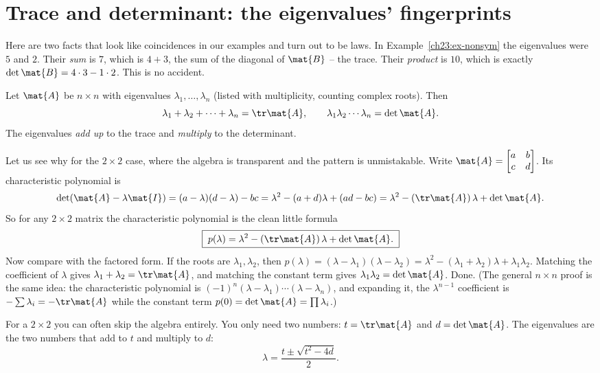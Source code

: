 \section{Trace and determinant: the eigenvalues' fingerprints}
\label{ch23:trace-det}

Here are two facts that look like coincidences in our examples and turn out to be
laws. In Example~\ref{ch23:ex-nonsym} the eigenvalues were $5$ and $2$. Their
\emph{sum} is $7$, which is $4+3$, the sum of the diagonal of $\mat{B}$ -- the
trace. Their \emph{product} is $10$, which is exactly $\det\mat{B}=4\cdot 3-1\cdot 2$.
This is no accident.

\begin{theorem}
\label{ch23:thm-trace-det}
Let $\mat{A}$ be $n\times n$ with eigenvalues $\lambda_1,\dots,\lambda_n$ (listed
with multiplicity, counting complex roots). Then
\[
  \lambda_1+\lambda_2+\cdots+\lambda_n=\tr\mat{A},
  \qquad
  \lambda_1\lambda_2\cdots\lambda_n=\det\mat{A}.
\]
The eigenvalues \emph{add up} to the trace and \emph{multiply} to the determinant.
\end{theorem}

Let us see why for the $2\times 2$ case, where the algebra is transparent and the
pattern is unmistakable. Write
$\mat{A}=\begin{bmatrix}a&b\\c&d\end{bmatrix}$. Its characteristic polynomial is
\[
  \det(\mat{A}-\lambda\mat{I})
  =(a-\lambda)(d-\lambda)-bc
  =\lambda^2-(a+d)\lambda+(ad-bc)
  =\lambda^2-(\tr\mat{A})\,\lambda+\det\mat{A}.
\]
So for any $2\times 2$ matrix the characteristic polynomial is the clean little
formula
\[
  \boxed{\;p(\lambda)=\lambda^2-(\tr\mat{A})\,\lambda+\det\mat{A}.\;}
\]
Now compare with the factored form. If the roots are $\lambda_1,\lambda_2$, then
$p(\lambda)=(\lambda-\lambda_1)(\lambda-\lambda_2)=\lambda^2-(\lambda_1+\lambda_2)\lambda+\lambda_1\lambda_2$.
Matching the coefficient of $\lambda$ gives
$\lambda_1+\lambda_2=\tr\mat{A}$, and matching the constant term gives
$\lambda_1\lambda_2=\det\mat{A}$. Done. (The general $n\times n$ proof is the same
idea: the characteristic polynomial is
$(-1)^n(\lambda-\lambda_1)\cdots(\lambda-\lambda_n)$, and expanding it, the
$\lambda^{n-1}$ coefficient is $-\sum\lambda_i=-\tr\mat{A}$ while the constant term
$p(0)=\det\mat{A}=\prod\lambda_i$.)

\begin{focusbox}
For a $2\times 2$ you can often skip the algebra entirely. You only need two
numbers: $t=\tr\mat{A}$ and $d=\det\mat{A}$. The eigenvalues are the two numbers
that add to $t$ and multiply to $d$:
\[
  \lambda=\frac{t\pm\sqrt{t^2-4d}}{2}.
\]
\end{focusbox}

